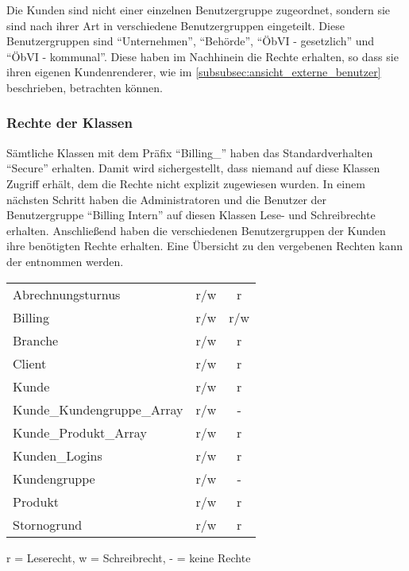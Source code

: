 Die Kunden sind nicht einer einzelnen Benutzergruppe zugeordnet, sondern sie sind nach ihrer Art in verschiedene Benutzergruppen eingeteilt.
Diese Benutzergruppen sind "`Unternehmen"', "`Behörde"', "`ÖbVI - gesetzlich"' und "`ÖbVI - kommunal"'.
Diese haben im Nachhinein die Rechte erhalten, so dass sie ihren eigenen Kundenrenderer, wie im \autoref{subsubsec:ansicht_externe_benutzer} beschrieben, betrachten können.

\subsubsection{Rechte der Klassen}
Sämtliche Klassen mit dem Präfix "`Billing\_"' haben das Standardverhalten "`Secure"' erhalten. Damit wird sichergestellt, dass niemand auf diese Klassen Zugriff erhält, dem die Rechte nicht explizit zugewiesen wurden.
In einem nächsten Schritt haben die Administratoren und die Benutzer der Benutzergruppe "`Billing Intern"' auf diesen Klassen Lese- und Schreibrechte erhalten.
Anschließend haben die verschiedenen Benutzergruppen der Kunden ihre benötigten Rechte erhalten.
Eine Übersicht zu den vergebenen Rechten kann der  entnommen werden. 

\begin{minipage}{\linewidth}
\centering
{} \label{tab:klassenrechte}
\begin{tabulary}{\textwidth}{|l|C|c|}
 \hline 
  &  &  \tabularnewline
 \hline 
 Abrechnungsturnus & r/w & r \\ 
 \hline 
 Billing & r/w & r/w \\ 
 \hline 
 Branche & r/w & r \\ 
 \hline 
 Client & r/w & r \\ 
 \hline 
 Kunde & r/w & r \\ 
 \hline 
 Kunde\_Kundengruppe\_Array & r/w & - \\ 
 \hline 
 Kunde\_Produkt\_Array & r/w & r \\ 
 \hline 
 Kunden\_Logins & r/w & r \\ 
 \hline 
 Kundengruppe & r/w & - \\ 
 \hline 
 Produkt & r/w & r \\ 
 \hline 
 Stornogrund & r/w & r \\ 
 \hline 
 \end{tabulary}
 \par
 \bigskip
 r = Leserecht, w = Schreibrecht, - = keine Rechte
 \end{minipage}
 
